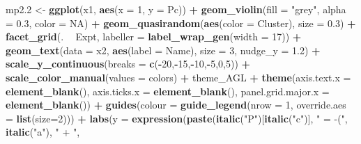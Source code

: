 \documentclass[
]{article}
\newenvironment{Shaded}{\begin{snugshade}}{\end{snugshade}}
\newcommand{\DataTypeTok}[1]{\textcolor[rgb]{0.13,0.29,0.53}{#1}}
\newcommand{\DecValTok}[1]{\textcolor[rgb]{0.00,0.00,0.81}{#1}}
\newcommand{\FloatTok}[1]{\textcolor[rgb]{0.00,0.00,0.81}{#1}}
\newcommand{\KeywordTok}[1]{\textcolor[rgb]{0.13,0.29,0.53}{\textbf{#1}}}
\newcommand{\NormalTok}[1]{#1}
\newcommand{\OperatorTok}[1]{\textcolor[rgb]{0.81,0.36,0.00}{\textbf{#1}}}
\newcommand{\OtherTok}[1]{\textcolor[rgb]{0.56,0.35,0.01}{#1}}
\newcommand{\StringTok}[1]{\textcolor[rgb]{0.31,0.60,0.02}{#1}}
\begin{document}
\begin{Shaded}
\begin{Highlighting}[]
{{{{{{{{{{{{{{\NormalTok{mp2}\FloatTok{.2}\NormalTok{ <-}\StringTok{ }\KeywordTok{ggplot}\NormalTok{(x1, }\KeywordTok{aes}\NormalTok{(}\DataTypeTok{x =} \DecValTok{1}\NormalTok{, }\DataTypeTok{y =}\NormalTok{ Pc)) }\OperatorTok{+}\StringTok{ }
\StringTok{  }\KeywordTok{geom_violin}\NormalTok{(}\DataTypeTok{fill =} \StringTok{"grey"}\NormalTok{, }\DataTypeTok{alpha =} \FloatTok{0.3}\NormalTok{, }\DataTypeTok{color =} \OtherTok{NA}\NormalTok{) }\OperatorTok{+}\StringTok{ }
\StringTok{  }\KeywordTok{geom_quasirandom}\NormalTok{(}\KeywordTok{aes}\NormalTok{(}\DataTypeTok{color =}\NormalTok{ Cluster), }\DataTypeTok{size =} \FloatTok{0.3}\NormalTok{) }\OperatorTok{+}\StringTok{ }
\StringTok{  }\KeywordTok{facet_grid}\NormalTok{(. }\OperatorTok{~}\StringTok{ }\NormalTok{Expt, }\DataTypeTok{labeller =} \KeywordTok{label_wrap_gen}\NormalTok{(}\DataTypeTok{width =} \DecValTok{17}\NormalTok{)) }\OperatorTok{+}
\StringTok{  }\KeywordTok{geom_text}\NormalTok{(}\DataTypeTok{data =}\NormalTok{ x2, }\KeywordTok{aes}\NormalTok{(}\DataTypeTok{label =}\NormalTok{ Name), }\DataTypeTok{size =} \DecValTok{3}\NormalTok{, }\DataTypeTok{nudge_y =} \FloatTok{1.2}\NormalTok{) }\OperatorTok{+}
\StringTok{  }\KeywordTok{scale_y_continuous}\NormalTok{(}\DataTypeTok{breaks =} \KeywordTok{c}\NormalTok{(}\OperatorTok{-}\DecValTok{20}\NormalTok{,}\OperatorTok{-}\DecValTok{15}\NormalTok{,}\OperatorTok{-}\DecValTok{10}\NormalTok{,}\OperatorTok{-}\DecValTok{5}\NormalTok{,}\DecValTok{0}\NormalTok{,}\DecValTok{5}\NormalTok{)) }\OperatorTok{+}
\StringTok{  }\KeywordTok{scale_color_manual}\NormalTok{(}\DataTypeTok{values =}\NormalTok{ colors) }\OperatorTok{+}
\StringTok{  }\NormalTok{theme_AGL }\OperatorTok{+}
\StringTok{  }\KeywordTok{theme}\NormalTok{(}\DataTypeTok{axis.text.x        =} \KeywordTok{element_blank}\NormalTok{(),}
        \DataTypeTok{axis.ticks.x       =} \KeywordTok{element_blank}\NormalTok{(),}
        \DataTypeTok{panel.grid.major.x =} \KeywordTok{element_blank}\NormalTok{()) }\OperatorTok{+}
\StringTok{  }\KeywordTok{guides}\NormalTok{(}\DataTypeTok{colour =} \KeywordTok{guide_legend}\NormalTok{(}\DataTypeTok{nrow =} \DecValTok{1}\NormalTok{, }\DataTypeTok{override.aes =} \KeywordTok{list}\NormalTok{(}\DataTypeTok{size=}\DecValTok{2}\NormalTok{))) }\OperatorTok{+}
\StringTok{  }\KeywordTok{labs}\NormalTok{(}\DataTypeTok{y =} \KeywordTok{expression}\NormalTok{(}\KeywordTok{paste}\NormalTok{(}\KeywordTok{italic}\NormalTok{(}\StringTok{"P"}\NormalTok{)[}\KeywordTok{italic}\NormalTok{(}\StringTok{"c"}\NormalTok{)], }\StringTok{" = -("}\NormalTok{, }\KeywordTok{italic}\NormalTok{(}\StringTok{"a"}\NormalTok{), }\StringTok{" + "}\NormalTok{, }
}}}}}}}}}}}}}}
\end{Highlighting}
\end{Shaded}
\end{document}
